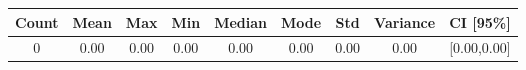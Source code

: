 \begin{tabular}{|c|c|c|c|c|c|c|c|c|}\hline
\rowcolor{Plum!20}
Count&Mean&Max&Min&Median&Mode&Std&Variance&CI [95\%]\\\hline\hline
0&0.00&0.00&0.00&0.00&0.00&0.00&0.00&[0.00,0.00]\\\hline
\end{tabular}
